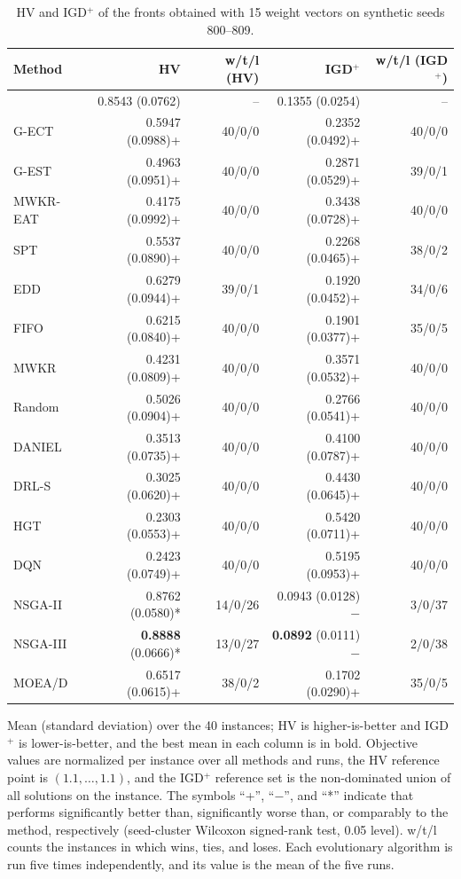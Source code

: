 \begin{table}
\centering
\begin{threeparttable}
\caption{HV and IGD$^{+}$ of the fronts obtained with 15 weight vectors on synthetic seeds 800--809.}
\label{tab:v9-front}
\footnotesize
\setlength{\tabcolsep}{4pt}
\begin{tabular*}{\textwidth}{@{\extracolsep{\fill}}lrrrr@{}}
\toprule
Method & HV & w/t/l (HV) & IGD$^{+}$ & w/t/l (IGD$^{+}$) \\
\midrule
\pgnd{} & 0.8543 (0.0762) & -- & 0.1355 (0.0254) & -- \\
\midrule
G-ECT & 0.5947 (0.0988)+ & 40/0/0 & 0.2352 (0.0492)+ & 40/0/0 \\
G-EST & 0.4963 (0.0951)+ & 40/0/0 & 0.2871 (0.0529)+ & 39/0/1 \\
MWKR-EAT & 0.4175 (0.0992)+ & 40/0/0 & 0.3438 (0.0728)+ & 40/0/0 \\
SPT & 0.5537 (0.0890)+ & 40/0/0 & 0.2268 (0.0465)+ & 38/0/2 \\
EDD & 0.6279 (0.0944)+ & 39/0/1 & 0.1920 (0.0452)+ & 34/0/6 \\
FIFO & 0.6215 (0.0840)+ & 40/0/0 & 0.1901 (0.0377)+ & 35/0/5 \\
MWKR & 0.4231 (0.0809)+ & 40/0/0 & 0.3571 (0.0532)+ & 40/0/0 \\
Random & 0.5026 (0.0904)+ & 40/0/0 & 0.2766 (0.0541)+ & 40/0/0 \\
\midrule
DANIEL & 0.3513 (0.0735)+ & 40/0/0 & 0.4100 (0.0787)+ & 40/0/0 \\
DRL-S & 0.3025 (0.0620)+ & 40/0/0 & 0.4430 (0.0645)+ & 40/0/0 \\
HGT & 0.2303 (0.0553)+ & 40/0/0 & 0.5420 (0.0711)+ & 40/0/0 \\
DQN & 0.2423 (0.0749)+ & 40/0/0 & 0.5195 (0.0953)+ & 40/0/0 \\
\midrule
NSGA-II & 0.8762 (0.0580)* & 14/0/26 & 0.0943 (0.0128)$-$ & 3/0/37 \\
NSGA-III & \textbf{0.8888} (0.0666)* & 13/0/27 & \textbf{0.0892} (0.0111)$-$ & 2/0/38 \\
MOEA/D & 0.6517 (0.0615)+ & 38/0/2 & 0.1702 (0.0290)+ & 35/0/5 \\
\bottomrule
\end{tabular*}
\begin{tablenotes}\footnotesize
\item Mean (standard deviation) over the 40 instances; HV is higher-is-better and IGD$^{+}$ is lower-is-better, and the best mean in each column is in bold. Objective values are normalized per instance over all methods and runs, the HV reference point is $(1.1,\ldots,1.1)$, and the IGD$^{+}$ reference set is the non-dominated union of all solutions on the instance. The symbols ``+'', ``$-$'', and ``*'' indicate that \pgnd{} performs significantly better than, significantly worse than, or comparably to the method, respectively (seed-cluster Wilcoxon signed-rank test, 0.05 level). w/t/l counts the instances in which \pgnd{} wins, ties, and loses. Each evolutionary algorithm is run five times independently, and its value is the mean of the five runs.
\end{tablenotes}
\end{threeparttable}
\end{table}
